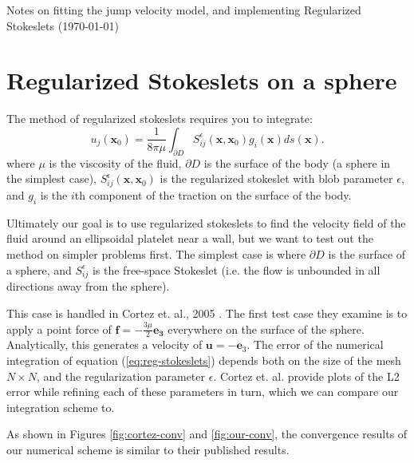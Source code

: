 \documentclass{article}
\begin{document}
\pagestyle{plain}

\begin{center}
  {\Large Notes on fitting the jump velocity model, and implementing
    Regularized Stokeslets (\today)}
\end{center}

\section{Regularized Stokeslets on a sphere}
\label{sec:regul-stok-sphere}

The method of regularized stokeslets requires you to integrate:
\begin{equation}
  \label{eq:reg-stokeslets}
  u_j(\mathbf{x}_0) = \frac{1}{8\pi \mu} \int_{\partial D}
  S_{ij}^\epsilon (\mathbf{x}, \mathbf{x}_0) g_i(\mathbf{x}) ds(\mathbf{x}).
\end{equation}
where $\mu$ is the viscosity of the fluid, $\partial D$ is the surface
of the body (a sphere in the simplest case), $S_{ij}^\epsilon
(\mathbf{x}, \mathbf{x}_0)$ is the regularized stokeslet with blob
parameter $\epsilon$, and $g_i$ is the $i$th component of the traction
on the surface of the body.

Ultimately our goal is to use regularized stokeslets to find the
velocity field of the fluid around an ellipsoidal platelet near a
wall, but we want to test out the method on simpler problems
first. The simplest case is where $\partial D$ is the surface of a
sphere, and $S_{ij}^\epsilon$ is the free-space Stokeslet (i.e. the
flow is unbounded in all directions away from the sphere).

This case is handled in Cortez et. al., 2005 \cite{Cortez2005}. The
first test case they examine is to apply a point force of $\mathbf{f}
= -\frac{3\mu}{2} \mathbf{e_3}$ everywhere on the surface of the
sphere. Analytically, this generates a velocity of $\mathbf{u} =
-\mathbf{e}_3$. The error of the numerical integration of equation
(\ref{eq:reg-stokeslets}) depends both on the size of the mesh $N
\times N$, and the regularization parameter $\epsilon$. Cortez
et. al. provide plots of the L2 error while refining each of these
parameters in turn, which we can compare our integration scheme to.

As shown in Figures \ref{fig:cortez-conv} and \ref{fig:our-conv}, the
convergence results of our numerical scheme is similar to their
published results.
\end{document}
